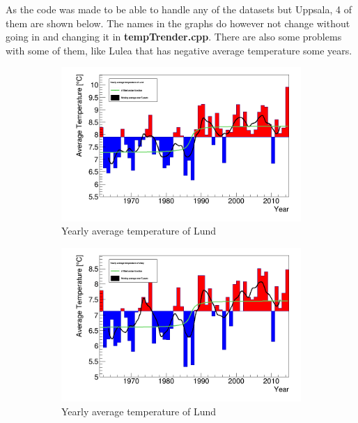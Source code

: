 As the code was made to be able to handle any of the datasets but Uppsala, 4 of them are shown below. The names in the graphs do however not change without going in and changing it in \textbf{tempTrender.cpp}. There are also some problems with some of them, like Lulea that has negative average temperature some years.

\begin{figure}
	\centering
	\begin{subfigure}[b]{0.49\lidwidth}
		\includegraphics[width=\linewidth]{yearAvg_Lund.png}
		\caption{Yearly average temperature of Lund}
		\label{Lund}
	\end{subfigure}
	\begin{subfigure}[b]{0.49\lidwidth}
		\includegraphics[width=14cm]{yearAvg_Visby.png}
		\caption{Yearly average temperature of Lund}
		\label{Visby}
	\end{subfigure}
	\begin{subfigure}[b]{0.49\lidwidth}

\end{subfigure}
\end{figure}
